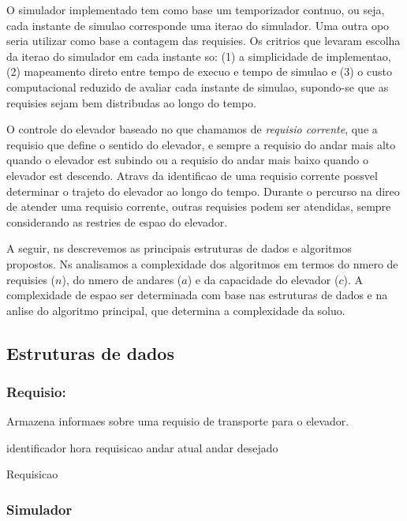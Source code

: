 \documentclass[12pt]{article}
\begin{document}
O simulador implementado tem como base um temporizador contnuo, ou seja, cada instante de simulao corresponde  uma iterao do simulador. Uma outra opo seria utilizar como base a contagem das requisies. Os critrios que levaram  escolha da iterao do simulador em cada instante so: (1) a simplicidade de implementao, (2) mapeamento direto entre tempo de execuo e tempo de simulao e (3) o custo computacional reduzido de avaliar cada instante de simulao, supondo-se que as requisies sejam bem distribudas ao longo do tempo.

O controle do elevador  baseado no que chamamos de \textit{requisio corrente}, que  a requisio que define o sentido do elevador, e  sempre a requisio do andar mais alto quando o elevador est subindo ou a requisio do andar mais baixo quando o elevador est descendo. Atravs da identificao de uma requisio corrente  possvel determinar o trajeto do elevador ao longo do tempo. Durante o percurso na direo de atender uma requisio corrente, outras requisies podem ser atendidas, sempre considerando as restries de espao do elevador.

A seguir, ns descrevemos as principais estruturas de dados e algoritmos propostos. Ns analisamos a complexidade dos algoritmos em termos do nmero de requisies ($n$), do nmero de andares ($a$) e da capacidade do elevador ($c$). A complexidade de espao ser determinada com base nas estruturas de dados e na anlise do algoritmo principal, que determina a complexidade da soluo.

\subsection{Estruturas de dados}

\subsubsection{Requisio:}

Armazena informaes sobre uma requisio de transporte para o elevador.
\begin{algorithm}[h!]
\begin{footnotesize}

	identificador\;
	hora requisicao\;
	andar atual\;
	andar desejado\;

\caption{Requisicao}%
\end{footnotesize}
\end{algorithm}

\subsubsection{Simulador}
\end{document}
